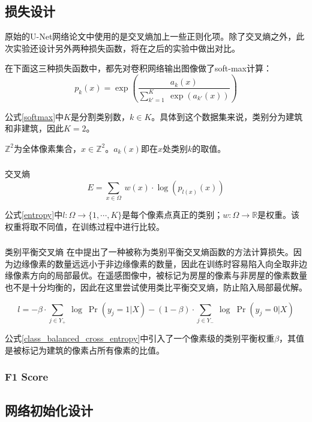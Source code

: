 \subsection{损失设计}
原始的U-Net网络论文中使用的是交叉熵加上一些正则化项。除了交叉熵之外，此次实验还设计另外两种损失函数，将在之后的实验中做出对比。

在下面这三种损失函数中，都先对卷积网络输出图像做了soft-max计算：
\begin{equation}\label{softmax}
p_k(x)=\exp(\frac{a_k(x)}{\sum\limits_{k'=1}^K \ \exp(a_{k'}(x))})
\end{equation}

公式\ref{softmax}中$K$是分割类别数，$k\in K$。具体到这个数据集来说，类别分为建筑和非建筑，因此$K=2$。

$\mathbb{Z}^2$为全体像素集合，$x\in \mathbb{Z}^2$。$a_k(x)$即在$x$处类别$k$的取值。
\subsubsection{}{交叉熵}
\begin{equation}\label{entropy}
E=\sum_{x\in \Omega}\ w(x)\cdot \log(p_{l(x)}(x))
\end{equation}

公式\ref{entropy}中$l: \Omega\rightarrow\{1,\cdots,K\}$是每个像素点真正的类别；$w: \Omega\rightarrow\mathbb{R}$是权重。该权重将取不同值，在训练过程中进行比较。
\subsubsection{}{类别平衡交叉熵}
在\cite{xie2015holistically}中提出了一种被称为类别平衡交叉熵函数的方法计算损失。因为边缘像素的数量远远小于非边缘像素的数量，因此在训练时容易陷入向全取非边缘像素方向的局部最优。在遥感图像中，被标记为房屋的像素与非房屋的像素数量也不是十分均衡的，因此在这里尝试使用类比平衡交叉熵，防止陷入局部最优解。

\begin{equation}\label{class_balanced_cross_entropy}
    l=-\beta\cdot \sum\limits_{j\in Y_+}\ \log\ \Pr(y_j=1|X)-(1-\beta)\cdot \sum\limits_{j\in Y_-}\ \log\ \Pr(y_j=0|X)
\end{equation}

公式\ref{class_balanced_cross_entropy}中引入了一个像素级的类别平衡权重$\beta$，其值是被标记为建筑的像素占所有像素的比值。
\subsubsection{F1 Score}
\subsection{网络初始化设计}
